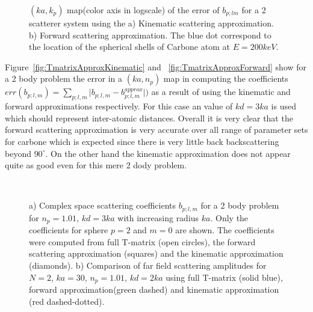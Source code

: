 \begin{figure}[h!]
  \centering
\caption{$(ka,k_p)$ map(color axis in logscale) of the error of $b_{p;lm}$
for a 2 scatterer system using the
a) Kinematic scattering approximation.
b) Forward scattering approximation.
The blue dot correspond to the location of the spherical shells of Carbone
atom at $E=200keV$.}
\end{figure}

Figure~\ref{fig:TmatrixApproxKinematic} and ~\ref{fig:TmatrixApproxForward} show
for a 2 body problem the error in a $(ka,n_p)$ map in computing the coefficients
$err(b_{p;l,m})=\sum_{p;l,m} \lvert b_{p;l,m} - b_{p;l,m}^{approx} \rvert)$
as a result of using the kinematic and forward approximations respectively.
For this case an value of $kd=3ka$ is used which should represent inter-atomic distances.
Overall it is very clear that the forward scattering approximation is very accurate
over all range of parameter sets for carbone which is expected since there is very
little back backscattering beyond $90^{\circ}$. On the other hand the kinematic
approximation does not appear quite as good even for this mere 2 dody problem.


\begin{figure}[h!]
  \centering
  \\
  \vspace{-1.1em}
\caption{
a) Complex space scattering coefficients $b_{p;l,m}$ for a 2 body problem for
$n_p=1.01$, $kd=3ka$ with increasing radius $ka$.
Only the coefficients for sphere $p=2$ and $m=0$ are shown.
The coefficients were computed from full T-matrix (open circles), the forward
scattering approximation (squares) and the kinematic approximation (diamonds).
b) Comparison of far field scattering amplitudes for $N=2$, $ka=30$, $n_p=1.01$,
$kd=2ka$ using full T-matrix (solid blue), forward approximation(green dashed)
and kinematic approximation (red dashed-dotted).}
\end{figure}

